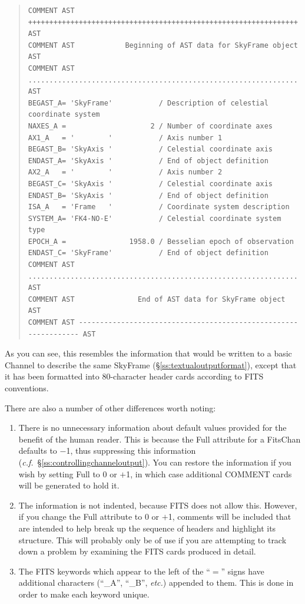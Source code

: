 \documentclass[twoside,11pt]{article}
\newcommand{\secref}[1]{\S\ref{#1}}
\newcommand{\secref}[1]{\ref{#1}}
\begin{document}
\begin{quote}
\small
\begin{verbatim}
COMMENT AST ++++++++++++++++++++++++++++++++++++++++++++++++++++++++++++++++ AST
COMMENT AST            Beginning of AST data for SkyFrame object             AST
COMMENT AST ................................................................ AST
BEGAST_A= 'SkyFrame'           / Description of celestial coordinate system
NAXES_A =                    2 / Number of coordinate axes
AX1_A   = '        '           / Axis number 1
BEGAST_B= 'SkyAxis '           / Celestial coordinate axis
ENDAST_A= 'SkyAxis '           / End of object definition
AX2_A   = '        '           / Axis number 2
BEGAST_C= 'SkyAxis '           / Celestial coordinate axis
ENDAST_B= 'SkyAxis '           / End of object definition
ISA_A   = 'Frame   '           / Coordinate system description
SYSTEM_A= 'FK4-NO-E'           / Celestial coordinate system type
EPOCH_A =               1958.0 / Besselian epoch of observation
ENDAST_C= 'SkyFrame'           / End of object definition
COMMENT AST ................................................................ AST
COMMENT AST               End of AST data for SkyFrame object                AST
COMMENT AST ---------------------------------------------------------------- AST
\end{verbatim}
\normalsize
\end{quote}

As you can see, this resembles the information that would be written
to a basic Channel to describe the same SkyFrame
(\secref{ss:textualoutputformat}), except that it has been formatted
into 80-character header cards according to FITS conventions.

There are also a number of other differences worth noting:

\begin{enumerate}
\item There is no unnecessary information about default values
provided for the benefit of the human reader. This is because the Full
attribute for a FitsChan defaults to $-$1, thus suppressing this
information ({\em{c.f.}}~\secref{ss:controllingchanneloutput}). You
can restore the information if you wish by setting Full to 0 or $+$1,
in which case additional COMMENT cards will be generated to hold it.

\item The information is not indented, because FITS does not allow
this. However, if you change the Full attribute to 0 or $+$1, comments
will be included that are intended to help break up the sequence of
headers and highlight its structure. This will probably only be of use
if you are attempting to track down a problem by examining the FITS
cards produced in detail.

\item The FITS keywords which appear to the left of the ``$=$'' signs
have additional characters (``\_A'', ``\_B'', {\em{etc.}}) appended to
them. This is done in order to make each keyword unique.
\end{enumerate}
\end{document}
